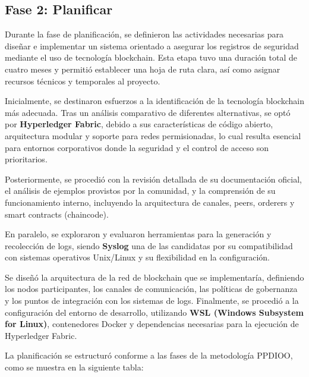 \subsection{Fase 2: Planificar}
Durante la fase de planificación, se definieron las actividades necesarias para diseñar e implementar un sistema orientado a asegurar los registros de seguridad mediante el uso de tecnología blockchain. Esta etapa tuvo una duración total de cuatro meses y permitió establecer una hoja de ruta clara, así como asignar recursos técnicos y temporales al proyecto.

Inicialmente, se destinaron esfuerzos a la identificación de la tecnología blockchain más adecuada. Tras un análisis comparativo de diferentes alternativas, se optó por \textbf{Hyperledger Fabric}, debido a sus características de código abierto, arquitectura modular y soporte para redes permisionadas, lo cual resulta esencial para entornos corporativos donde la seguridad y el control de acceso son prioritarios.

Posteriormente, se procedió con la revisión detallada de su documentación oficial, el análisis de ejemplos provistos por la comunidad, y la comprensión de su funcionamiento interno, incluyendo la arquitectura de canales, peers, orderers y smart contracts (chaincode).

En paralelo, se exploraron y evaluaron herramientas para la generación y recolección de logs, siendo \textbf{Syslog} una de las candidatas por su compatibilidad con sistemas operativos Unix/Linux y su flexibilidad en la configuración.

Se diseñó la arquitectura de la red de blockchain que se implementaría, definiendo los nodos participantes, los canales de comunicación, las políticas de gobernanza y los puntos de integración con los sistemas de logs. Finalmente, se procedió a la configuración del entorno de desarrollo, utilizando \textbf{WSL (Windows Subsystem for Linux)}, contenedores Docker y dependencias necesarias para la ejecución de Hyperledger Fabric.

La planificación se estructuró conforme a las fases de la metodología PPDIOO, como se muestra en la siguiente tabla:

